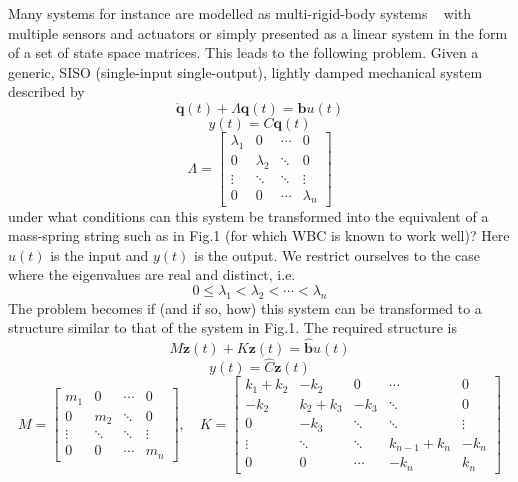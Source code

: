 \documentclass{mbd_fullpaper}
\begin{document}
Many systems for instance are modelled as multi-rigid-body systems ~\cite{Kane1980} with multiple sensors and actuators or simply presented as a linear system in the form of a set of state space matrices.
This leads to the following problem. Given a generic, SISO (single-input single-output), lightly damped mechanical system described by
\begin{equation}
\ddot{\mathbf{q}}(t) + \Lambda\mathbf{q}(t) = \mathbf{b}u(t)
\label{eq:modal1}
\end{equation}
\begin{equation}
y(t) = C \mathbf{q}(t)
\label{eq:modal2}
\end{equation}
\begin{equation}
\Lambda = \begin{bmatrix}
\lambda_1  &  0 & \cdots & 0 \\
0 & \lambda_2  & \ddots & 0 \\
\vdots & \ddots & \ddots & \vdots \\
0 & 0 & \cdots & \lambda_n \end{bmatrix}
\end{equation}
under what conditions can this system be transformed into the equivalent of a mass-spring string such as in Fig.1 (for which WBC is known to work well)?
Here $u(t)$ is the input and $y(t)$ is the output.
We restrict ourselves to the case where the eigenvalues are real and distinct, i.e.
\begin{equation}
0 \leq \lambda_1<\lambda_2< \cdots <\lambda_n
\label{eq:lambda}
\end{equation}
The problem becomes if (and if so, how) this system can be transformed to a structure similar to that of the system in Fig.1.
The required structure is
\begin{equation}
M\ddot{\mathbf{z}}(t) + K\mathbf{z}(t) = \mathbf{\hat{b}}u(t)
\label{eq:eom1}
\end{equation}
\begin{equation}
y(t) = \hat{C} \mathbf{z}(t)
\label{eq:eom2}
\end{equation}
\begin{equation}
M = \begin{bmatrix}
m_1  &  0 & \cdots & 0 \\
0 & m_2  & \ddots & 0 \\
\vdots & \ddots & \ddots & \vdots \\
0 & 0 & \cdots & m_n \end{bmatrix}
, \quad
K = \begin{bmatrix}
k_1+k_2  &  -k_2 & 0 & \cdots & 0 \\
-k_2 & k_2+k_3  & -k_3 & \ddots & 0 \\
0 & -k_3 & \ddots & \ddots & \vdots \\
\vdots & \ddots & \ddots & k_{n-1}+k_n & -k_{n} \\
0 & 0 & \cdots & -k_{n} & k_n \end{bmatrix}
\end{equation}
\end{document}
